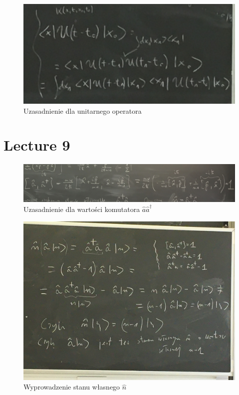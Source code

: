 \documentclass[12pt,a4paper]{report}
\begin{document}
\begin{figure}[!ht]
        \centering
        \includegraphics[width=\linewidth]{App_6_Rys_1.JPG}
        \caption{Uzasadnienie dla unitarnego operatora}
        \label{fig:app_6:unitarny}
\end{figure}

\section{Lecture 9}

\begin{figure}[!ht]
        \centering
        \includegraphics[width=\linewidth]{App_9_Rys_1.JPG}
        \caption{Uzasadnienie dla wartości komutatora $\hat{a}\hat{a}^\dagger$}
        \label{fig:app_9:comm_kreacji_anihillacji}
\end{figure}

\begin{figure}[!ht]
        \centering
        \includegraphics[width=\linewidth]{App_9_Rys_2.JPG}
        \caption{Wyprowadzenie stanu własnego $\hat{n}$}
        \label{fig:app_9:stany_wlasne_n}
\end{figure}
\end{document}

